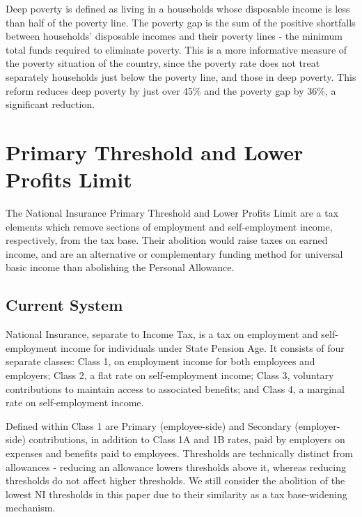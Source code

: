 \documentclass{article}
\begin{document}
    Deep poverty is defined as living in a households whose disposable income is less than half of the poverty line. The poverty gap is the sum of the positive shortfalls between households' disposable incomes and their poverty lines - the minimum total funds required to eliminate poverty. This is a more informative measure of the poverty situation of the country, since the poverty rate does not treat separately households just below the poverty line, and those in deep poverty. This reform reduces deep poverty by just over 45\% and the poverty gap by 36\%, a significant reduction.

    \section{Primary Threshold and Lower Profits Limit}

    The National Insurance Primary Threshold and Lower Profits Limit are a tax elements which remove sections of employment and self-employment income, respectively, from the tax base. Their abolition would raise taxes on earned income, and are an alternative or complementary funding method for universal basic income than abolishing the Personal Allowance.

    \subsection{Current System}
    National Insurance, separate to Income Tax, is a tax on employment and self-employment income for individuals under State Pension Age. It consists of four separate classes: Class 1, on employment income for both employees and employers; Class 2, a flat rate on self-employment income; Class 3, voluntary contributions to maintain access to associated benefits; and Class 4, a marginal rate on self-employment income.

    Defined within Class 1 are Primary (employee-side) and Secondary (employer-side) contributions, in addition to Class 1A and 1B rates, paid by employers on expenses and benefits paid to employees. Thresholds are technically distinct from allowances - reducing an allowance lowers thresholds above it, whereas reducing thresholds do not affect higher thresholds. We still consider the abolition of the lowest NI thresholds in this paper due to their similarity as a tax base-widening mechanism. 
\end{document}
